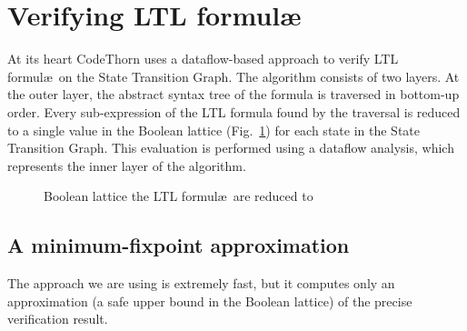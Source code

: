 \section{Verifying LTL formul\ae}

\newcommand{\ffalse}{\ensuremath{\mathit{false}}}
\newcommand{\ttrue}{\ensuremath{\mathit{true}}}

At its heart CodeThorn uses a dataflow-based approach to verify LTL
formul\ae\ on the State Transition Graph. The algorithm consists of
two layers. At the outer layer, the abstract syntax tree of the
formula is traversed in bottom-up order. Every sub-expression of the
LTL formula found by the traversal is reduced to a single value in the
Boolean lattice (\cf Fig.~\ref{fig:bool_lattice}) for each state in
the State Transition Graph. This evaluation is performed using a
dataflow analysis, which represents the inner layer of the algorithm.

\begin{figure}
  \centering
  \caption{Boolean lattice the LTL formul\ae\ are reduced to}
  \label{fig:bool_lattice}
\end{figure}

\newcommand{\state}{\ensuremath{\mathit{s}}}
\newcommand{\STG}{\ensuremath{\mathrm{STG}}}
\newcommand{\States}{\ensuremath{\mathit{States}}}
\newcommand{\prop}[1]{\ensuremath{p_{\state,#1}}} 
\newcommand{\propp}[1]{\ensuremath{p_{\state',#1}}} 
\newcommand{\G}{\ensuremath{\mathrm{G}}}
\newcommand{\F}{\ensuremath{\mathrm{F}}}
\newcommand{\X}{\ensuremath{\mathrm{X}}}
\newcommand{\R}{\ensuremath{\mathrm{R}}}
\newcommand{\U}{\ensuremath{\mathrm{U}}}
\newcommand{\WU}{\ensuremath{\mathrm{WU}}}

\subsection{A minimum-fixpoint approximation}
The approach we are using is extremely fast, but it computes only an
approximation (a safe upper bound in the Boolean lattice) of the precise verification result. 

